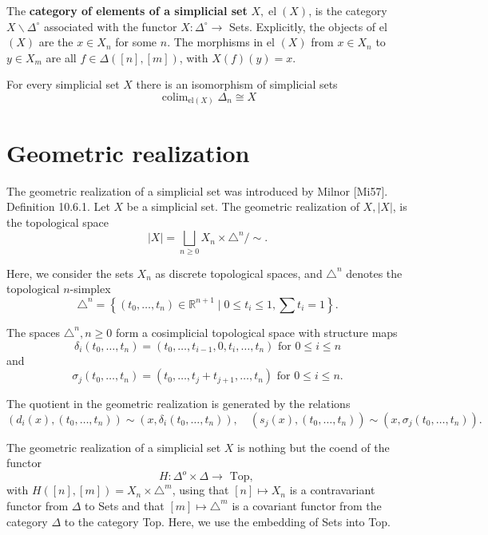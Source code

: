 The \textbf{category of elements of a simplicial set} $X, \operatorname{el}(X)$, is the category $X \backslash \Delta^{\circ}$ associated with the functor $X: \Delta^{\circ} \rightarrow$ Sets. Explicitly, the objects of el $(X)$ are the $x \in X_n$ for some $n$. The morphisms in el $(X)$ from $x \in X_n$ to $y \in X_m$ are all $f \in \Delta([n],[m])$, with $X(f)(y)=x$.

\begin{prop}
For every simplicial set $X$ there is an isomorphism of simplicial sets
$$
\operatorname{colim}_{\mathrm{el}(X)} \Delta_n \cong X
$$
\end{prop}

\section{Geometric realization}

The geometric realization of a simplicial set was introduced by Milnor [Mi57].
Definition 10.6.1. Let $X$ be a simplicial set. The geometric realization of $X,|X|$, is the topological space
$$
|X|=\bigsqcup_{n \geq 0} X_n \times \triangle^n / \sim .
$$

Here, we consider the sets $X_n$ as discrete topological spaces, and $\triangle^n$ denotes the topological $n$-simplex
$$
\triangle^n=\left\{\left(t_0, \ldots, t_n\right) \in \mathbb{R}^{n+1} \mid 0 \leq t_i \leq 1, \sum t_i=1\right\} .
$$

The spaces $\triangle^n, n \geq 0$ form a cosimplicial topological space with structure maps
$$
\delta_i\left(t_0, \ldots, t_n\right)=\left(t_0, \ldots, t_{i-1}, 0, t_i, \ldots, t_n\right) \text { for } 0 \leq i \leq n
$$
and
$$
\sigma_j\left(t_0, \ldots, t_n\right)=\left(t_0, \ldots, t_j+t_{j+1}, \ldots, t_n\right) \text { for } 0 \leq i \leq n .
$$

The quotient in the geometric realization is generated by the relations
$$
\left(d_i(x),\left(t_0, \ldots, t_n\right)\right) \sim\left(x, \delta_i\left(t_0, \ldots, t_n\right)\right), \quad\left(s_j(x),\left(t_0, \ldots, t_n\right)\right) \sim\left(x, \sigma_j\left(t_0, \ldots, t_n\right)\right) .
$$

\begin{rema}
    The geometric realization of a simplicial set $X$ is nothing but the coend of the functor
    $$
    H: \Delta^o \times \Delta \rightarrow \text { Top, }
    $$
    with $H([n],[m])=X_n \times \triangle^m$, using that $[n] \mapsto X_n$ is a contravariant functor from $\Delta$ to Sets and that $[m] \mapsto \triangle^m$ is a covariant functor from the category $\Delta$ to the category Top. Here, we use the embedding of Sets into Top.
\end{rema}

